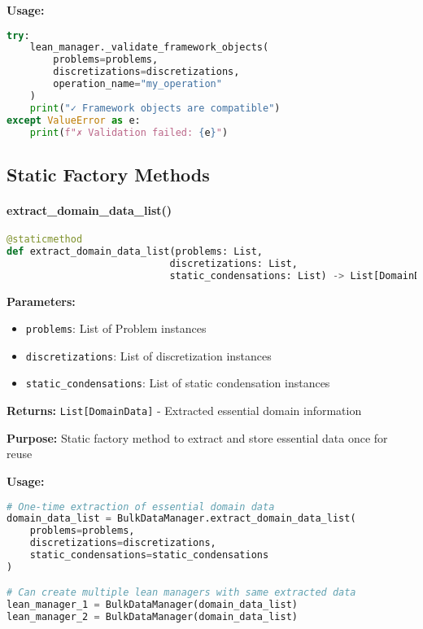 \textbf{Usage:}
\begin{lstlisting}[language=Python, caption=Validation Usage]
try:
    lean_manager._validate_framework_objects(
        problems=problems,
        discretizations=discretizations,
        operation_name="my_operation"
    )
    print("✓ Framework objects are compatible")
except ValueError as e:
    print(f"✗ Validation failed: {e}")
\end{lstlisting}

\subsection{Static Factory Methods}
\label{subsec:static_factory_methods}

\paragraph{extract\_domain\_data\_list()}\leavevmode
\begin{lstlisting}[language=Python, caption=Domain Data Extraction Method]
@staticmethod
def extract_domain_data_list(problems: List, 
                            discretizations: List, 
                            static_condensations: List) -> List[DomainData]
\end{lstlisting}

\textbf{Parameters:}
\begin{itemize}
    \item \texttt{problems}: List of Problem instances
    \item \texttt{discretizations}: List of discretization instances
    \item \texttt{static\_condensations}: List of static condensation instances
\end{itemize}

\textbf{Returns:} \texttt{List[DomainData]} - Extracted essential domain information

\textbf{Purpose:} Static factory method to extract and store essential data once for reuse

\textbf{Usage:}
\begin{lstlisting}[language=Python, caption=Domain Data Extraction Usage]
# One-time extraction of essential domain data
domain_data_list = BulkDataManager.extract_domain_data_list(
    problems=problems,
    discretizations=discretizations,
    static_condensations=static_condensations
)

# Can create multiple lean managers with same extracted data
lean_manager_1 = BulkDataManager(domain_data_list)
lean_manager_2 = BulkDataManager(domain_data_list)
\end{lstlisting}

